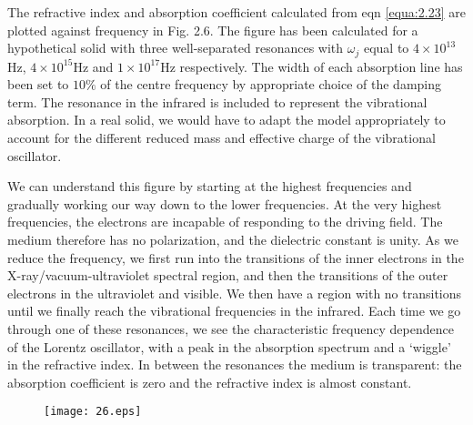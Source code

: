 \documentclass[12pt]{book}
\begin{document}
The refractive index and absorption coefficient calculated from eqn \ref{equa:2.23} are plotted against frequency in Fig. 2.6. The figure has been calculated for a hypothetical solid with three well-separated resonances with $\omega_j$ equal to $4\times 10^{13}$Hz, $4\times10^{15}$Hz and $1\times10^{17}$Hz respectively. The width of each absorption line has been set to $10\%$ of the centre frequency by appropriate choice of the damping term. The resonance in the infrared is included to represent the vibrational absorption. In a real solid, we would have to adapt the model appropriately to account for the different reduced mass and effective charge of the vibrational oscillator.

We can understand this figure by starting at the highest frequencies and gradually working our way down to the lower frequencies. At the very highest frequencies, the electrons are incapable of responding to the driving field. The medium therefore has no polarization, and the dielectric constant is unity. As we reduce the frequency, we first run into the transitions of the inner electrons in the X-ray/vacuum-ultraviolet spectral region, and then the transitions of the outer electrons in the ultraviolet and visible. We then have a region with no transitions until we finally reach the vibrational frequencies in the infrared. Each time we go through one of these resonances, we see the characteristic frequency dependence of the Lorentz oscillator, with a peak in the absorption spectrum and a `wiggle' in the refractive index. In between the resonances the medium is transparent: the absorption coefficient is zero and the refractive index is almost constant.
\begin{figure}[htbp]
  \texttt{[image: 26.eps]}\\
  \label{fig:2.6}
\end{figure}
\end{document}
